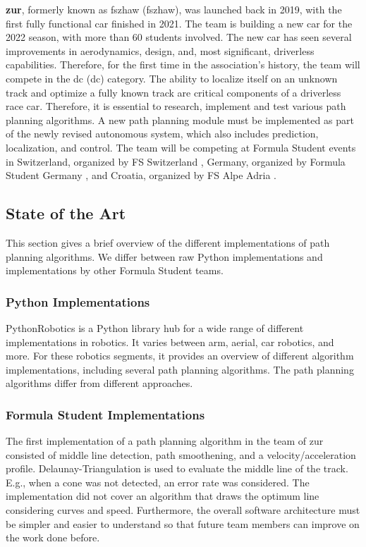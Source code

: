 \textbf{\acrlong{zur}}, formerly known as \acrlong{fszhaw} (\acrshort{fszhaw}), was launched back in 2019, with the first fully functional car finished in 2021. The team is building a new car for the 2022 season, with more than 60 students involved. The new car has seen several improvements in aerodynamics, design, and, most significant, driverless capabilities. \cite{fszhaw_launch}
Therefore, for the first time in the association's history, the team will compete in the \acrlong{dc} (\acrshort{dc}) category.
The ability to localize itself on an unknown track and optimize a fully known track are critical components of a driverless race car. Therefore, it is essential to research, implement and test various path planning algorithms. A new path planning module must be implemented as part of the newly revised autonomous system, which also includes prediction, localization, and control.
The team will be competing at Formula Student events in Switzerland, organized by FS Switzerland \cite{fsswitzerland}, Germany, organized by Formula Student Germany \cite{fs_germany}, and Croatia, organized by FS Alpe Adria \cite{fs_alpe_adria}.

\subsection{State of the Art} \label{sec:State of the Art}
This section gives a brief overview of the different implementations of path planning algorithms. We differ between raw Python implementations and implementations by other Formula Student teams.

\subsubsection{Python Implementations} \label{sec:Python Implementations}
PythonRobotics is a Python library hub for a wide range of different implementations in robotics. It varies between arm, aerial, car robotics, and more.
For these robotics segments, it provides an overview of different algorithm implementations, including several path planning algorithms.
The path planning algorithms differ from different approaches.
\cite{python_robotics}

\subsubsection{Formula Student Implementations} \label{sec:Formula Student Implementations}
The first implementation of a path planning algorithm in the team of \acrlong{zur} consisted of middle line detection, path smoothening, and a velocity/acceleration profile. Delaunay-Triangulation is used to evaluate the middle line of the track. E.g., when a cone was not detected, an error rate was considered. The implementation did not cover an algorithm that draws the optimum line considering curves and speed. Furthermore, the overall software architecture must be simpler and easier to understand so that future team members can improve on the work done before.
\cite{autopilot_for_formula_student_jerome}

